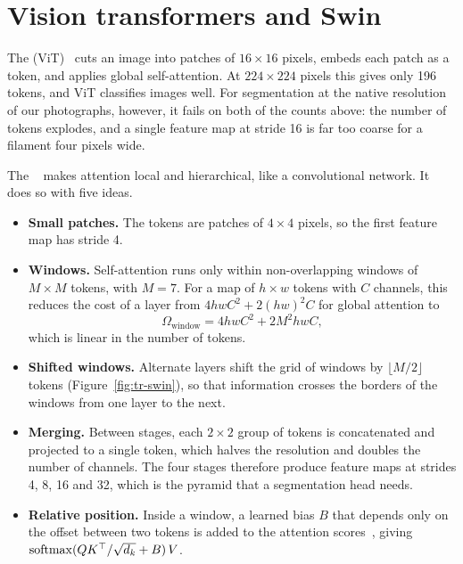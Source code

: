 \section{Vision transformers and Swin}\label{sec:tr-swin}
The  (ViT)~\citep{vit} cuts an image into patches of $16\times16$ pixels,
embeds each patch as a token, and applies global self-attention. At $224\times224$ pixels this gives
only 196 tokens, and ViT classifies images well. For segmentation at the native resolution of our
photographs, however, it fails on both of the counts above: the number of tokens explodes, and a
single feature map at stride 16 is far too coarse for a filament four pixels wide.

The ~\citep{swin} makes attention local and hierarchical, like a
convolutional network. It does so with five ideas.
\begin{itemize}[leftmargin=*,itemsep=2pt]
\item \textbf{Small patches.} The tokens are patches of $4\times4$ pixels, so the first feature map
has stride 4.
\item \textbf{Windows.} Self-attention runs only within non-overlapping windows of $M\times M$ tokens,
with $M=7$. For a map of $h\times w$ tokens with $C$ channels, this reduces the cost of a layer from
$4hwC^2 + 2(hw)^2C$ for global attention to
\begin{equation}
\Omega_{\text{window}} = 4hwC^2 + 2M^2hwC,
\end{equation}
which is linear in the number of tokens.
\item \textbf{Shifted windows.} Alternate layers shift the grid of windows by $\lfloor M/2\rfloor$
tokens (Figure~\ref{fig:tr-swin}), so that information crosses the borders of the windows from one
layer to the next.
\item \textbf{Merging.} Between stages, each $2\times2$ group of tokens is concatenated and projected
to a single token, which halves the resolution and doubles the number of channels. The four stages
therefore produce feature maps at strides 4, 8, 16 and 32, which is the pyramid that a segmentation
head needs.
\item \textbf{Relative position.} Inside a window, a learned bias $B$ that depends only on the offset
between two tokens is added to the attention scores~\citep{shaw2018}, giving $\operatorname{softmax}(QK^{\top}/\sqrt{d_k} + B)\,V$.
\end{itemize}


